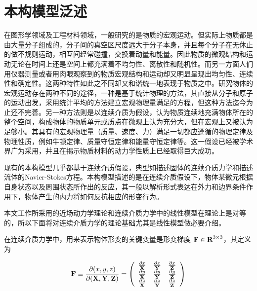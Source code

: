\section{本构模型泛述}
\label{constitutive_model}
在图形学领域及工程材料领域，一般研究的是物质的宏观运动。但实际上物质都是由大量分子组成的，分子间的真空区尺度远大于分子本身，并且每个分子在无休止的做不规则运动，相互间经常碰撞，交换着动量和能量。因此物质的微观结构和运动无论在时间上还是空间上都充满着不均匀性、离散性和随机性。而另一方面人们用仪器测量或者用肉眼观察到的物质宏观结构和运动却又明显呈现出均匀性、连续性和确定性。这两种特性如此之不同却又和谐统一地表现于物质之中。研究物体的宏观运动存在两种不同的途径，一种是基于统计物理的方法，其直接从分子和原子的运动出发，采用统计平均的方法建立宏观物理量满足的方程，但这种方法迄今为止还不完善。另一种方法则是以连续介质为假设，认为物质连续地充满物体所在的整个空间，构成物体的物质单元或质点在微观上认为充分大，但在宏观上又被认为足够小。其具有的宏观物理量（质量、速度、力）满足一切都应遵循的物理定律及物理性质，例如牛顿定律、质量守恒定律和能量守恒定律等。这一假设已经被学术界广为采用，并且在揭示物质材料的动力学性质上已经取得巨大成功。

现有的本构模型几乎都基于连续介质假设，典型如描述固体的连续介质力学和描述流体的Navier-Stokes方程。本构模型描述的是在连续介质假设下，物体某微元根据自身状态以及周围状态所作出的反应，其一般以解析形式表达在外力和边界条件作用下，物体产生的内力将如何反抗相应的形变行为。

本文工作所采用的近场动力学理论和连续介质力学中的线性模型在理论上是对等的，所以下面将对连续介质力学的理论基础尤其是线性模型做必要介绍。

在连续介质力学中，用来表示物体形变的关键变量是形变梯度 $\textbf{F} \in \textbf{R}^{3\times3}$，其定义为

\begin{equation}
\textbf{F} \equiv \frac{\partial(\boldmath{x}, \boldmath{y}, \boldmath{z})}{\partial(\textbf{X}, \textbf{Y}, \textbf{Z})}
=
\left(
  \begin{array}{ccc}
    \frac{\partial\boldmath{x}}{\textbf{X}}& \frac{\partial\boldmath{x}}{\textbf{Y}} & \frac{\partial\boldmath{x}}{\textbf{Z}} \\
    \frac{\partial\boldmath{y}}{\textbf{X}}& \frac{\partial\boldmath{y}}{\textbf{Y}} & \frac{\partial\boldmath{y}}{\textbf{Z}} \\
    \frac{\partial\boldmath{z}}{\textbf{X}}& \frac{\partial\boldmath{z}}{\textbf{Y}} & \frac{\partial\boldmath{z}}{\textbf{Z}} \\
  \end{array}
\right)
\end{equation}

